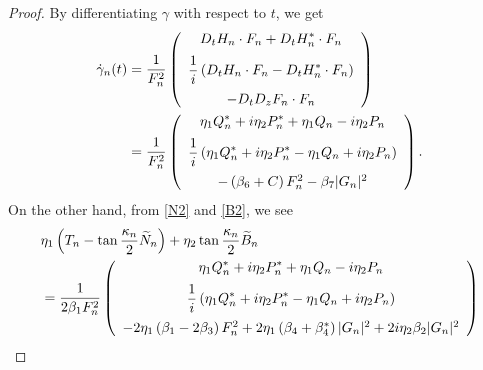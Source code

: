 \documentclass[10pt,leqno]{amsart}
\numberwithin{equation}{section}
\begin{document}
\begin{proof}
    By differentiating $\gamma$ with respect to $t$, we get
\begin{equation}\label{gdot201}
\begin{split}
\dot{\gamma}_{n}(t)&=\frac{1}{F_{n}^{2}}\left(
    \begin{array}{c}
    \vspace{2mm}
\displaystyle D_{t}H_{n}\cdot F_{n}+D_{t}H_{n}^{*}\cdot F_{n}\\
\vspace{2mm}
\displaystyle\frac{1}{i}\left(D_{t}H_{n}\cdot F_{n}-D_{t}H_{n}^{*}\cdot F_{n}\right)\\
-D_{t}D_{z}F_{n}\cdot F_{n}
    \end{array}
  \right)\\
  &=\frac{1}{F_{n}^{2}}\left(
    \begin{array}{c}
    \vspace{2mm}
\displaystyle \eta_{1}Q_{n}^{*}+i\eta_{2}P_{n}^{*}+\eta_{1}Q_{n}-i\eta_{2}P_{n}\\
\vspace{2mm}
\displaystyle\frac{1}{i}\left(\eta_{1}Q_{n}^{*}+i\eta_{2}P_{n}^{*}-\eta_{1}Q_{n}+i\eta_{2}P_{n}\right)\\
-\left(\beta_{6}+C\right)F_{n}^{2}-\beta_{7}|G_{n}|^{2}
    \end{array}
  \right).
   \end{split}
\end{equation}
On the other hand, from \eqref{N2} and \eqref{B2}, we see
\begin{equation}\label{gdot301}
\begin{split}
&\eta_{1}\left(T_{n}-\tan\frac{\kappa_{n}}{2}\widetilde{N}_{n}\right)+\eta_{2}\tan\frac{\kappa_{n}}{2}\widetilde{B}_{n}\\
&=\frac{1}{2\beta_{1} F_{n}^{2}}\left(
    \begin{array}{c}
    \vspace{2mm}
\displaystyle \eta_{1}Q_{n}^{*}+i\eta_{2}P_{n}^{*}+\eta_{1}Q_{n}-i\eta_{2}P_{n}\\
\vspace{2mm}
\displaystyle\frac{1}{i}\left(\eta_{1}Q_{n}^{*}+i\eta_{2}P_{n}^{*}-\eta_{1}Q_{n}+i\eta_{2}P_{n}\right)\\
-2\eta_{1}\left(\beta_{1}-2\beta_{3}\right)F_{n}^{2}+2\eta_{1}\left(\beta_{4}+\beta_{4}^{*}\right)|G_{n}|^{2}+2i\eta_{2}\beta_{2}|G_{n}|^{2}
    \end{array}
  \right)
  \end{split}

\end{equation}
\end{proof}
\end{document}
